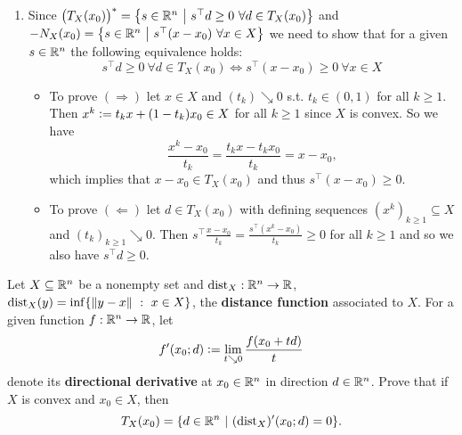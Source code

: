 \begin{solution}
\begin{enumerate}
        \item Since \(\big(T_X(x_0)\big)^* = \left\{ s \in \mathbb{R}^n \ \middle| \ s^\top d \ge 0 \ \forall d \in T_X(x_0) \right\}\) and \(- N_X(x_0) = \set{s \in \R^n}{s^\top (x-x_0) \ \forall x \in X}\) we need to show that for a given \(s \in \mathbb{R}^n\) the following equivalence holds: \[s^\top d \ge 0 \ \forall d \in T_X(x_0) \iff s^\top (x - x_0) \ge 0 \ \forall x \in X \]
        \begin{itemize}
            \item To prove \((\Rightarrow)\) let \(x \in X\) and \((t_k) \searrow 0\) s.t. \(t_k \in (0, 1)\) for all \(k \ge 1\). Then \(x^k \mathrel{\mathop:}= t_k x + (1-t_k) x_0 \in X\) for all \(k \ge 1\) since \(X\) is convex. So we have \[\frac{x^k - x_0}{t_k} = \frac{t_k x - t_k x_0}{t_k} = x - x_0,\] which implies that \(x - x_0 \in T_X(x_0)\) and thus \(s^\top (x - x_0) \ge 0\).
            \item To prove \((\Leftarrow)\) let \(d \in T_X(x_0)\) with defining sequences \((x^k)_{k \ge 1} \subseteq X\) and \((t_k)_{k \ge 1} \searrow 0\). Then \(s^\top \frac{x - x_0}{t_k} = \frac{s^\top (x^k - x_0)}{t_k} \ge 0\) for all \(k \ge 1\) and so we also have \(s^\top d \ge 0\).
        \end{itemize}
    \end{enumerate}
\end{solution}

\begin{problem}
    Let \(X \subseteq \mathbb{R}^n\) be a nonempty set and \(\operatorname{dist}_X : \mathbb{R}^n \to \mathbb{R}\), \(\operatorname{dist}_X(y) = \inf\{\left\| y-x \right\| \ : \ x \in X\}\), the \textbf{distance function} associated to \(X\). For a given function \(f : \mathbb{R}^n \to \mathbb{R}\), let
    \[f'(x_0;d) \mathrel{\mathop:}= \lim_{t \searrow 0} \frac{f(x_0 + t d)}{t}\]
    denote its \textbf{directional derivative} at \(x_0 \in \mathbb{R}^n\) in direction \(d \in \mathbb{R}^n\). Prove that if \(X\) is convex and \(x_0 \in X\), then
    \[T_X(x_0) = \{ d \in \R^n \ | \ (\dist_X)'(x_0;d) = 0 \}.\]
\end{problem}

\begin{solution}
    
\end{solution}

